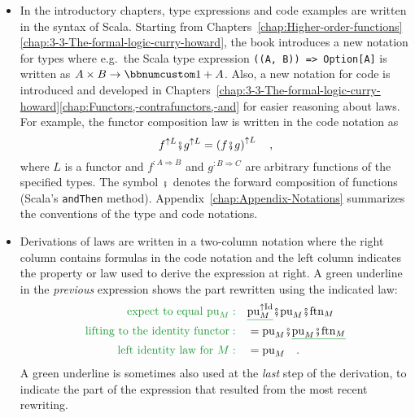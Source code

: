 \begin{itemize}
\item In the introductory chapters, type expressions and code examples are
written in the syntax of Scala. Starting from Chapters~\ref{chap:Higher-order-functions}\textendash \ref{chap:3-3-The-formal-logic-curry-howard},
the book introduces a new notation for types where e.g.~the Scala
type expression \lstinline!((A, B)) => Option[A]! is written as $A\times B\Rightarrow\bbnum 1+A$.
Also, a new notation for code is introduced and developed in Chapters~\ref{chap:3-3-The-formal-logic-curry-howard}\textendash \ref{chap:Functors,-contrafunctors,-and}
for easier reasoning about laws. For example, the functor composition
law is written in the code notation as
\[
f^{\uparrow L}\bef g^{\uparrow L}=\left(f\bef g\right)^{\uparrow L}\quad,
\]
where $L$ is a functor and $f^{:A\Rightarrow B}$ and $g^{:B\Rightarrow C}$
are arbitrary functions of the specified types. The symbol $\bef$
denotes the forward composition of functions (Scala's \lstinline!andThen!
method). Appendix~\ref{chap:Appendix-Notations} summarizes the conventions
of the type and code notations.
\item Derivations of laws are written in a two-column notation where the
right column contains formulas in the code notation and the left column
indicates the property or law used to derive the expression at right.
A green underline in the \emph{previous} expression shows the part
rewritten using the indicated law:
\begin{align*}
{\color{greenunder}\text{expect to equal }\text{pu}_{M}:}\quad & \gunderline{\text{pu}_{M}^{\uparrow\text{Id}}}\bef\text{pu}_{M}\bef\text{ftn}_{M}\\
{\color{greenunder}\text{lifting to the identity functor}:}\quad & =\text{pu}_{M}\bef\gunderline{\text{pu}_{M}\bef\text{ftn}_{M}}\\
{\color{greenunder}\text{left identity law for }M:}\quad & =\text{pu}_{M}\quad.
\end{align*}
A green underline is sometimes also used at the \emph{last} step of
the derivation, to indicate the part of the expression that resulted
from the most recent rewriting.
\end{itemize}

